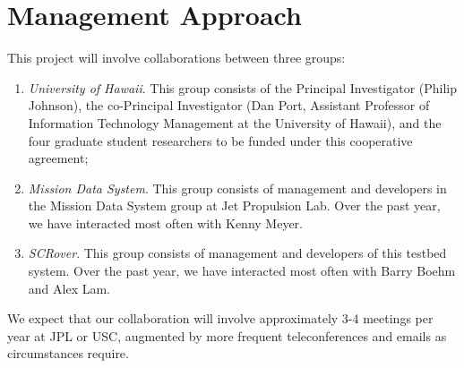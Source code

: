
\section{Management Approach}

This project will involve collaborations between three groups:

\begin{enumerate}
\item {\em University of Hawaii}.  This group consists of the Principal
Investigator (Philip Johnson), the co-Principal Investigator (Dan Port,
Assistant Professor of Information Technology Management at the University of
Hawaii), and the four graduate student researchers to be funded under this
cooperative agreement;

\item {\em Mission Data System}. This group consists of management and
developers in the Mission Data System group at Jet Propulsion Lab.  Over
the past year, we have interacted most often with Kenny Meyer.

\item {\em SCRover}.  This group consists of management and developers of this testbed
system.  Over the past year, we have interacted most often with Barry Boehm
and Alex Lam. 

\end{enumerate}

We expect that our collaboration will involve approximately 3-4 meetings
per year at JPL or USC, augmented by more frequent teleconferences and
emails as circumstances require. 
